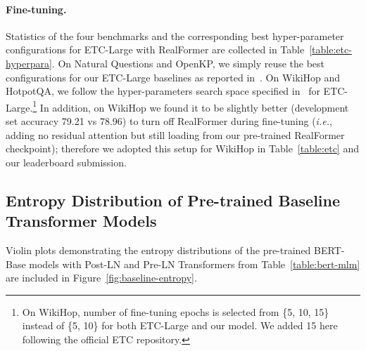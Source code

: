 \documentclass[11pt,a4paper]{article}
\begin{document}
\paragraph{Fine-tuning.} 
Statistics of the four benchmarks and the corresponding best hyper-parameter configurations for ETC-Large with RealFormer are collected in Table~\ref{table:etc-hyperpara}. 
On Natural Questions and OpenKP, we simply reuse the best configurations for our ETC-Large baselines as reported in~\citet{Ainslie-2020-etc}. 
On WikiHop and HotpotQA, we follow the hyper-parameters search space specified in~\citet{Ainslie-2020-etc} for ETC-Large.\footnote{On WikiHop, number of fine-tuning epochs is selected from \{5, 10, 15\} instead of \{5, 10\} for both ETC-Large and our model. We added 15 here following the official ETC repository.} In addition, on WikiHop we found it to be slightly better (development set accuracy 79.21 vs 78.96) to turn off RealFormer during fine-tuning (\emph{i.e.}, adding no residual attention but still loading from our pre-trained RealFormer checkpoint); therefore we adopted this setup for WikiHop in Table~\ref{table:etc} and our leaderboard submission.



\subsection{Entropy Distribution of Pre-trained Baseline Transformer Models} \label{sec:appendix:entropy}

Violin plots demonstrating the entropy distributions of the pre-trained BERT-Base models with Post-LN and Pre-LN Transformers from Table~\ref{table:bert-mlm} are included in Figure~\ref{fig:baseline-entropy}.

\begin{figure*}[!t]
\centering
{}
\caption{Distribution of entropies of the attention probabilities of the tokens of 8,192 held-out examples using the pre-trained BERT-Base with \textbf{Post-LN} and \textbf{Pre-LN} Transformer respectively (see Section~\ref{sec:pre-train}). For better legibility, (1) attention heads in each layer are ordered by their medians of entropies, and (2) distributions are color-coded based on the median of entropies: RED (median  4.5), YELLOW (1.5  median  4.5), BLUE (median  1.5), \emph{i.e.}, colder colors mean sparser attention. Note that here top layers (layer 9-11) tend to have larger entropies compared to RealFormer, which means that attention is relatively \emph{denser}.}
\label{fig:baseline-entropy}
\end{figure*}
\end{document}
